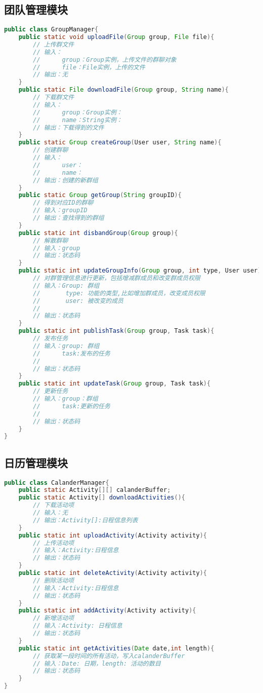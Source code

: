 \subsection{\color{red}团队管理模块}
\begin{lstlisting}[language=Java, caption=团队管理模块接口]
public class GroupManager{
    public static void uploadFile(Group group, File file){
        // 上传群文件
        // 输入：
        //      group：Group实例，上传文件的群聊对象
        //      file：File实例，上传的文件
        // 输出：无
    }
    public static File downloadFile(Group group, String name){
        // 下载群文件
        // 输入：
        //      group：Group实例：
        //      name：String实例：
        // 输出：下载得到的文件
    }
    public static Group createGroup(User user, String name){
        // 创建群聊
        // 输入：
        //      user：
        //      name：
        // 输出：创建的新群组
    }
    public static Group getGroup(String groupID){
        // 得到对应ID的群聊
        // 输入：groupID
        // 输出：查找得到的群组
    }
    public static int disbandGroup(Group group){
        // 解散群聊
        // 输入：group
        // 输出：状态码
    }
    public static int updateGroupInfo(Group group, int type, User user){
        // 对群管理信息进行更新，包括增减群成员和改变群成员权限
        // 输入：Group: 群组
        //       type: 功能的类型,比如增加群成员，改变成员权限
        //       user: 被改变的成员
        //      
        // 输出：状态码
    }
    public static int publishTask(Group group, Task task){
        // 发布任务
        // 输入：group: 群组
        //      task:发布的任务
        //      
        // 输出：状态码
    }
    public static int updateTask(Group group, Task task){
        // 更新任务
        // 输入：group：群组
        //      task:更新的任务
        //      
        // 输出：状态码
    }
}
\end{lstlisting}

\subsection{\color{red}日历管理模块}
\begin{lstlisting}[language=Java, caption=日历管理模块接口]
public class CalanderManager{
    public static Activity[][] calanderBuffer;
    public static Activity[] downloadActivities(){
        // 下载活动项
        // 输入：无
        // 输出：Activity[]:日程信息列表
    }
    public static int uploadActivity(Activity activity){
        // 上传活动项
        // 输入：Activity:日程信息
        // 输出：状态码
    }
    public static int deleteActivity(Activity activity){
        // 删除活动项
        // 输入：Activity:日程信息
        // 输出：状态码
    }
    public static int addActivity(Activity activity){
        // 新增活动项
        // 输入：Activity: 日程信息
        // 输出：状态码
    }
    public static int getActivities(Date date,int length){
        // 获取某一段时间的所有活动，写入calanderBuffer
        // 输入：Date: 日期，length: 活动的数目
        // 输出：状态码
    }
}
\end{lstlisting}

